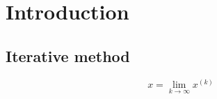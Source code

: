 \section*{Introduction}

\subsection*{Iterative method}


\begin{equation}\label{eq:converge}
    x = \lim_{k \to \infty} x^{(k)}
\end{equation}
